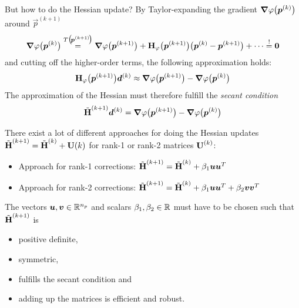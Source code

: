 			But how to do the Hessian update? By Taylor-expanding the gradient \( \grad{\varphi}\big(\bm{p}^{(k)}\big) \) around \( \vec{p}^{(k + 1)} \)
			\begin{align*}
				\grad{\varphi}\big(\bm{p}^{(k)}\big) \overset{T\big(\!\bm{p}^{(k + 1)}\!\big)}{=} \grad{\varphi}\big(\bm{p}^{(k + 1)}\big) + \bm{\mathrm{H}}_\varphi\big(\bm{p}^{(k + 1)}\big) \big( \bm{p}^{(k)} - \bm{p}^{(k + 1)} \big) + \cdots \overset{!}{=} \bm{0}
			\end{align*}
			and cutting off the higher-order terms, the following approximation holds:
			\begin{align*}
				\bm{\mathrm{H}}_\varphi\big(\bm{p}^{(k + 1)}\big) \bm{d}^{(k)} \approx \grad{\varphi}\big(\bm{p}^{(k + 1)}\big) - \grad{\varphi}\big(\bm{p}^{(k)}\big)
			\end{align*}
			The approximation of the Hessian must therefore fulfill the \emph{secant condition}
			\begin{align*}
				\tilde{\bm{\mathrm{H}}}^{(k + 1)} \bm{d}^{(k)} = \grad{\varphi}\big(\bm{p}^{(k + 1)}\big) - \grad{\varphi}\big(\bm{p}^{(k)}\big)
			\end{align*}

			There exist a lot of different approaches for doing the Hessian updates \( \tilde{\bm{\mathrm{H}}}^{(k + 1)} = \tilde{\bm{\mathrm{H}}}^{(k)} + \bm{\mathrm{U}}{(k)} \) for rank-1 or rank-2 matrices \(\bm{\mathrm{U}}^{(k)}\):
			\begin{itemize}
				\item Approach for rank-1 corrections: \tabto{6cm} \( \tilde{\bm{\mathrm{H}}}^{(k + 1)} = \tilde{\bm{\mathrm{H}}}^{(k)} + \beta_1 \bm{u} \bm{u}^T \)
				\item Approach for rank-2 corrections: \tabto{6cm} \( \tilde{\bm{\mathrm{H}}}^{(k + 1)} = \tilde{\bm{\mathrm{H}}}^{(k)} + \beta_1 \bm{u} \bm{u}^T + \beta_2 \bm{v} \bm{v}^T \)
			\end{itemize}
			The vectors \( \bm{u}, \bm{v} \in \mathbb{R}^{n_p} \) and scalars \( \beta_1, \beta_2 \in \mathbb{R} \) must have to be chosen such that \( \tilde{\bm{\mathrm{H}}}^{(k + 1)} \) is
			\begin{itemize}
				\item positive definite,
				\item symmetric,
				\item fulfills the secant condition and
				\item adding up the matrices is efficient and robust.
			\end{itemize}

